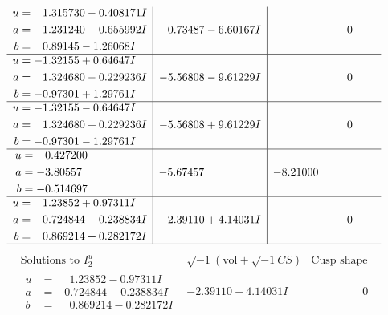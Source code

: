 \documentclass[1p]{elsarticle_modified}
\theoremstyle{definition}
\newcommand{\I}{\sqrt{-1}}
\begin{document}
$$\begin{array}{c|c|c}
\begin{aligned}
u &= \phantom{-}1.315730 - 0.408171 I \\
a &= -1.231240 + 0.655992 I \\
b &= \phantom{-}0.89145 - 1.26068 I\end{aligned}
 & \phantom{-}0.73487 - 6.60167 I & \phantom{-0.000000 } 0 \\ \hline\begin{aligned}
u &= -1.32155 + 0.64647 I \\
a &= \phantom{-}1.324680 - 0.229236 I \\
b &= -0.97301 + 1.29761 I\end{aligned}
 & -5.56808 - 9.61229 I & \phantom{-0.000000 } 0 \\ \hline\begin{aligned}
u &= -1.32155 - 0.64647 I \\
a &= \phantom{-}1.324680 + 0.229236 I \\
b &= -0.97301 - 1.29761 I\end{aligned}
 & -5.56808 + 9.61229 I & \phantom{-0.000000 } 0 \\ \hline\begin{aligned}
u &= \phantom{-}0.427200\phantom{ +0.000000I} \\
a &= -3.80557\phantom{ +0.000000I} \\
b &= -0.514697\phantom{ +0.000000I}\end{aligned}
 & -5.67457\phantom{ +0.000000I} & -8.21000\phantom{ +0.000000I} \\ \hline\begin{aligned}
u &= \phantom{-}1.23852 + 0.97311 I \\
a &= -0.724844 + 0.238834 I \\
b &= \phantom{-}0.869214 + 0.282172 I\end{aligned}
 & -2.39110 + 4.14031 I & \phantom{-0.000000 } 0\\
 \hline 
 \end{array}$$\newpage$$\begin{array}{c|c|c}  
\text{Solutions to }I^u_{2}& \I (\text{vol} + \sqrt{-1}CS) & \text{Cusp shape}\\
 \hline 
\begin{aligned}
u &= \phantom{-}1.23852 - 0.97311 I \\
a &= -0.724844 - 0.238834 I \\
b &= \phantom{-}0.869214 - 0.282172 I\end{aligned}
 & -2.39110 - 4.14031 I & \phantom{-0.000000 } 0 \\ \hline\begin{aligned}

\end{aligned}
\end{array}$$
\end{document}
